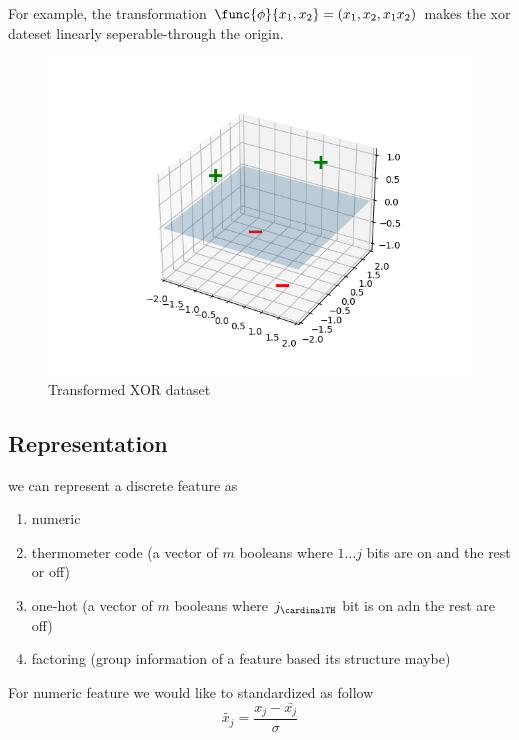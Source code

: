 For example, the transformation \(\func{\phi}{x_1, x_2} = (x_1,x_2,x_1x_2)\) makes the xor dateset linearly seperable-through the origin.
\begin{figure}[!ht]
    \centering
    \includegraphics{Chapters/graphics/xor_3d.png}
    \caption{Transformed XOR dataset}
\end{figure}
\subsection{Representation}
we can represent a discrete feature as
\begin{enumerate}
    \item numeric
    \item thermometer code (a vector of \(m\) booleans where \(1\dots j\) bits are on and the rest or off)
    \item one-hot (a vector of \(m\) booleans where \(j_{\cardinalTH}\) bit is on adn the rest are off)
    \item factoring (group information of a feature based its structure maybe)
\end{enumerate}

For numeric feature we would like to standardized as follow
\begin{equation*}
    \tilde{x_j}  = \dfrac{x_j - \bar{x_j}}{\sigma}
\end{equation*}